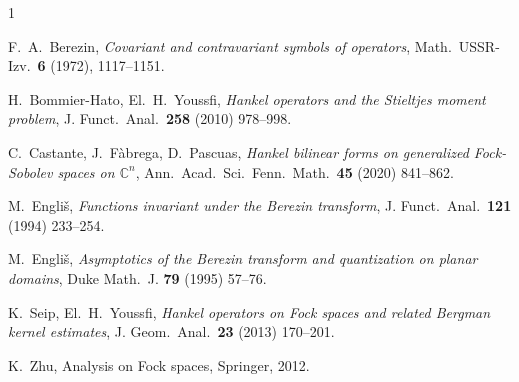 \documentclass[12pt]{amsart}
\numberwithin{equation}{section}
\theoremstyle{plain}
\numberwithin{equation}{section}
\begin{document}
\begin{thebibliography}{1}

 F.~A.~Berezin, \textit{Covariant and contravariant symbols of operators}, Math.\ USSR-Izv.\ {\bf 6} (1972), 1117--1151.

 H.~Bommier-Hato, El.~H.~Youssfi, \textit{Hankel operators and the Stieltjes moment problem}, J. Funct.\ Anal.\ {\bf 258} (2010) 978--998.

 C.~Castante, J.~F\`abrega, D.~Pascuas, \textit{Hankel bilinear forms on generalized Fock-Sobolev spaces on $\mathbb C^{n}$}, Ann.\ Acad.\ Sci.\ Fenn.\ Math.\ 
{\bf 45} (2020) 841--862.

 M.~Engli\v{s}, \textit{Functions invariant under the Berezin transform}, J. Funct.\ Anal.\ {\bf 121} (1994) 233--254.

 M.~Engli\v{s}, \textit{Asymptotics of the Berezin transform and quantization on planar domains}, Duke Math.\ J. {\bf 79} (1995) 57--76.

 K.~Seip, El.~H.~Youssfi, \textit{Hankel operators on Fock spaces and related Bergman kernel estimates}, J. Geom.\ Anal.\ {\bf 23} (2013) 170--201.

 K.~Zhu, Analysis on Fock spaces, Springer, 2012.





\end{thebibliography}
\end{document}
